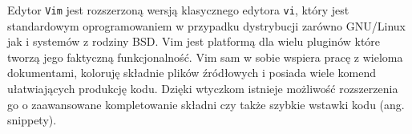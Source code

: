 \par
Edytor \texttt{Vim} jest rozszerzoną wersją klasycznego edytora \texttt{vi}, który jest standardowym oprogramowaniem w przypadku dystrybucji zarówno GNU/Linux jak i systemów z rodziny BSD. Vim jest platformą dla wielu pluginów które tworzą jego faktyczną funkcjonalność. Vim sam w sobie wspiera pracę z wieloma dokumentami, koloruję składnie plików źródłowych i posiada wiele komend ułatwiających produkcję kodu. Dzięki wtyczkom istnieje możliwość rozszerzenia go o zaawansowane kompletowanie składni czy także szybkie wstawki kodu (ang. snippety).

\clearpage
